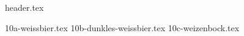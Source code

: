 \clearpage
{}
\divisorLine

{header.tex}

\begin{multicols}{2}

{10a-weissbier.tex}
{10b-dunkles-weissbier.tex}
{10c-weizenbock.tex}

\end{multicols}